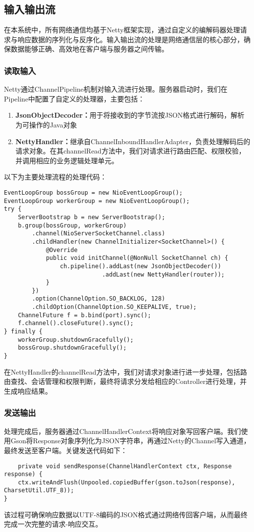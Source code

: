 \subsection{输入输出流}
在本系统中，所有网络通信均基于Netty框架实现，通过自定义的编解码器处理请求与响应数据的序列化与反序化。输入输出流的处理是网络通信层的核心部分，确保数据能够正确、高效地在客户端与服务器之间传输。
\subsubsection{读取输入}
Netty通过ChannelPipeline机制对输入流进行处理。服务器启动时，我们在Pipeline中配置了自定义的处理器，主要包括：
\begin{enumerate}
    \item \textbf{JsonObjectDecoder：}用于将接收到的字节流按JSON格式进行解码，解析为可操作的Java对象
    \item \textbf{NettyHandler：}继承自ChannelInboundHandlerAdapter，负责处理解码后的请求对象。在其channelRead方法中，我们对请求进行路由匹配、权限校验，并调用相应的业务逻辑处理单元。
\end{enumerate}
以下为主要处理流程的处理代码：
\begin{lstlisting}
EventLoopGroup bossGroup = new NioEventLoopGroup();
EventLoopGroup workerGroup = new NioEventLoopGroup();
try {
    ServerBootstrap b = new ServerBootstrap();
    b.group(bossGroup, workerGroup)
        .channel(NioServerSocketChannel.class)
        .childHandler(new ChannelInitializer<SocketChannel>() {
            @Override
            public void initChannel(@NonNull SocketChannel ch) {
                ch.pipeline().addLast(new JsonObjectDecoder())
                            .addLast(new NettyHandler(router));
            }
        })
        .option(ChannelOption.SO_BACKLOG, 128)
        .childOption(ChannelOption.SO_KEEPALIVE, true);
    ChannelFuture f = b.bind(port).sync();
    f.channel().closeFuture().sync();
} finally {
    workerGroup.shutdownGracefully();
    bossGroup.shutdownGracefully();
}
\end{lstlisting}
在NettyHandler的channelRead方法中，我们对请求对象进行进一步处理，包括路由查找、会话管理和权限判断，最终将请求分发给相应的Controller进行处理，并生成响应结果。

\subsubsection{发送输出}
处理完成后，服务器通过ChannelHandlerContext将响应对象写回客户端。我们使用Gson将Response对象序列化为JSON字符串，再通过Netty的Channel写入通道，最终发送至客户端。关键发送代码如下：
\begin{lstlisting}
    private void sendResponse(ChannelHandlerContext ctx, Response response) {
    ctx.writeAndFlush(Unpooled.copiedBuffer(gson.toJson(response), CharsetUtil.UTF_8));
}
\end{lstlisting}
该过程可确保响应数据以UTF-8编码的JSON格式通过网络传回客户端，从而最终完成一次完整的请求-响应交互。

